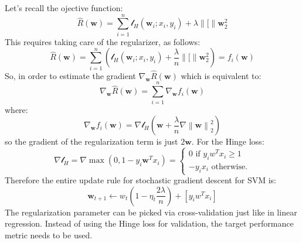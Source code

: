 \documentclass[a4paper,10pt,twoside]{article}
\newcommand\norm[1]{\left\lVert#1\right\rVert}
\begin{document}
Let's recall the ojective function:
\begin{equation*}
    \hat{R}(\mathbf{w})=\sum_{i=1}^{n}\mathcal{l}_{H}(\mathbf{w}_i; x_i,y_i) + \lambda\norm[{\mathbf{w}}_2^2
\end{equation*}
This requires taking care of the regularizer, as follows:
\begin{equation*}
    \hat{R}(\mathbf{w})=\sum_{i=1}^{n}\left(\mathcal{l}_{H}(\mathbf{w}_i; x_i,y_i) + \frac{\lambda}{n}\norm[{\mathbf{w}}_2^2\right)=f_i(\mathbf{w})
\end{equation*}
So, in order to estimate the gradient $\nabla_{\mathbf{w}}\hat{R}(\mathbf{w})$ which is equivalent to:
\begin{equation*}
    \nabla_{\mathbf{w}}\hat{R}(\mathbf{w})=\sum_{i=1}^{n}\nabla_{\mathbf{w}}f_{i}(\mathbf{w})
\end{equation*}
where:
\begin{equation*}
    \nabla_{\mathbf{w}}f_{i}(\mathbf{w}) = \nabla\mathcal{l}_{H}(\mathbf{w}+\frac{\lambda}{n}\nabla\norm{\mathbf{w}}_2^2)
\end{equation*}
so the gradient of the regularization term is just $2\mathbf{w}$. For the Hinge loss:
\begin{equation*}
    \nabla\mathcal{l}_H = \nabla\max(0,1-y_i\mathbf{w}^Tx_i)
    = \begin{cases}
        0\text{ if } y_iw^Tx_i\geq 1\\
        -y_ix_i\text{ otherwise.}
    \end{cases}
\end{equation*}
Therefore the entire update rule for stochastic gradient descent for SVM is:
\begin{equation*}
    \mathbf{w}_{t+1}\leftarrow w_t\left(1-\eta_t\frac{2\lambda}{n}\right)+\left[y_iw^Tx_i\right]
\end{equation*}
The regularization parameter can be picked via cross-validation just like in linear regression. Instead of using the Hinge loss for validation, the target performance metric needs to be used.
\end{document}
